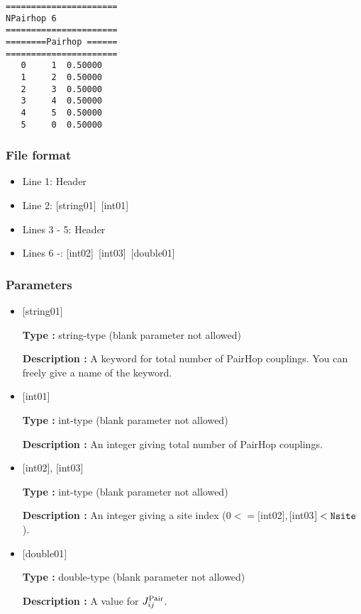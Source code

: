 \begin{minipage}{12.5cm}
\begin{screen}
\begin{verbatim}
====================== 
NPairhop 6  
====================== 
========Pairhop ====== 
====================== 
   0     1  0.50000
   1     2  0.50000
   2     3  0.50000
   3     4  0.50000
   4     5  0.50000
   5     0  0.50000
\end{verbatim}
\end{screen}
\end{minipage}

\subsubsection{File format}
 \begin{itemize}
   \item  Line 1:  Header
   \item  Line 2:   [string01]~[int01]
   \item  Lines 3 - 5:  Header
   \item  Lines 6 -: 
   [int02]~[int03]~[double01] 
  \end{itemize}
\subsubsection{Parameters}
 \begin{itemize}

   \item  $[$string01$]$
   
    {\bf Type :} string-type (blank parameter not allowed)

   {\bf Description :} A keyword for total number of PairHop couplings. You can freely give a name of the keyword.

   \item  $[$int01$]$
   
    {\bf Type :} int-type (blank parameter not allowed)

   {\bf Description :}  An integer giving total number of PairHop couplings.

  \item  $[$int02$]$, $[$int03$]$
  
 {\bf Type :} int-type (blank parameter not allowed)

{\bf Description :} An integer giving a site index ($0<= [$int02$], [$int03$]<\verb|Nsite|$).
 
 \item  $[$double01$]$
   
   {\bf Type :} double-type (blank parameter not allowed)

  {\bf Description :}   A value for $J_{ij}^{\rm Pair}$.
  
\end{itemize}

